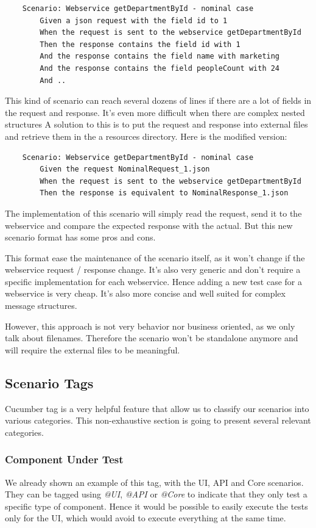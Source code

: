\begin{verbatim}
    Scenario: Webservice getDepartmentById - nominal case
        Given a json request with the field id to 1
        When the request is sent to the webservice getDepartmentById
        Then the response contains the field id with 1
        And the response contains the field name with marketing
        And the response contains the field peopleCount with 24
        And ..
\end{verbatim}

This kind of scenario can reach several dozens of lines if there are a lot of
fields in the request and response.
It's even more difficult when there are complex nested structures
A solution to this is to put the request and response into external files and
retrieve them in the a resources directory.
Here is the modified version:

\begin{verbatim}
    Scenario: Webservice getDepartmentById - nominal case
        Given the request NominalRequest_1.json
        When the request is sent to the webservice getDepartmentById
        Then the response is equivalent to NominalResponse_1.json
\end{verbatim}

The implementation of this scenario will simply read the request, send it to
the webservice and compare the expected response with the actual.
But this new scenario format has some pros and cons.

This format ease the maintenance of the scenario itself, as it won't change if
the webservice request / response change.
It's also very generic and don't require a specific implementation for each
webservice.
Hence adding a new test case for a webservice is very cheap.
It's also more concise and well suited for complex message structures.

However, this approach is not very behavior nor business oriented, as we only
talk about filenames.
Therefore the scenario won't be standalone anymore and will require the
external files to be meaningful.

\subsection{Scenario Tags}\label{subsec:scenario-tags}
Cucumber tag is a very helpful feature that allow us to classify our
scenarios into various categories.
This non-exhaustive section is going to present several relevant categories.

\subsubsection{Component Under Test}
We already shown an example of this tag, with the UI, API and Core scenarios.
They can be tagged using \textit{@UI}, \textit{@API} or \textit{@Core} to
indicate that they only test a specific type of component.
Hence it would be possible to easily execute the tests only for the UI, which
would avoid to execute everything at the same time.

